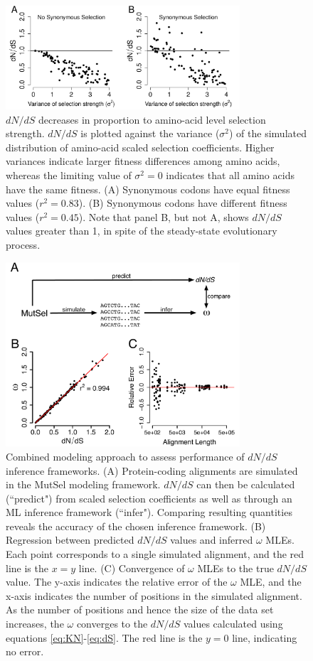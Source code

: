 \documentclass{pnastwo}
\begin{document}
\begin{figure}[htbp]
	\centerline{\includegraphics[width=8.7cm]{figures/MainText/dnds_variance.pdf}}
	\caption{\label{dnds_variance} $dN/dS$ decreases in proportion to amino-acid level selection strength. $dN/dS$ is plotted against the variance ($\sigma^2$) of the simulated distribution of amino-acid scaled selection coefficients. Higher variances indicate larger fitness differences among amino acids, whereas the limiting value of $\sigma^2 = 0$ indicates that all amino acids have the same fitness. (A) Synonymous codons have equal fitness values ($r^2=0.83$). (B) Synonymous codons have different fitness values ($r^2=0.45$). Note that panel B, but not A, shows $dN/dS$ values greater than 1, in spite of the steady-state evolutionary process.}
\end{figure}
		
		
\vspace{2cm}
		
\begin{figure}[htbp]
	\centerline{\includegraphics[width=8.7cm]{figures/MainText/regression_convergence.pdf}}
	\caption{\label{reg_conv} Combined modeling approach to assess performance of $dN/dS$ inference frameworks. (A) Protein-coding alignments are simulated in the MutSel modeling framework. $dN/dS$ can then be calculated (``predict") from scaled selection coefficients as well as through an ML inference framework (``infer"). Comparing resulting quantities reveals the accuracy of the chosen inference framework. (B) Regression between predicted $dN/dS$ values and inferred $\omega$ MLEs. Each point corresponds to a single simulated alignment, and the red line is the $x=y$ line. (C) Convergence of $\omega$ MLEs to the true $dN/dS$ value. The y-axis indicates the relative error of the $\omega$ MLE, and the x-axis indicates the number of positions in the simulated alignment. As the number of positions and hence the size of the data set increases, the $\omega$ converges to the $dN/dS$ values calculated using equations \eqref{eq:KN}-\eqref{eq:dS}. The red line is the $y=0$ line, indicating no error.}
\end{figure}
	
\end{document}
